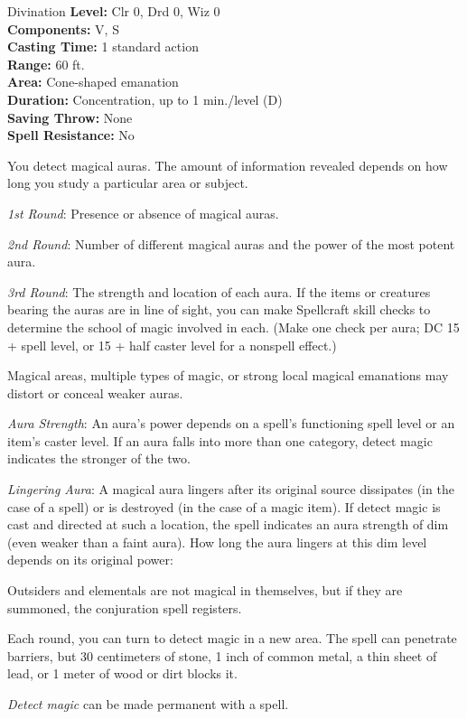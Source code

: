 {Divination}
{
	\textbf{Level:}
	Clr 0, Drd 0, Wiz 0\\
	\textbf{Components:}
	V, S\\
	\textbf{Casting Time:}
	1 standard action\\
	\textbf{Range:}
	60 ft.\\
	\textbf{Area:}
	Cone-shaped emanation\\
	\textbf{Duration:}
	Concentration, up to 1 min./level (D)\\
	\textbf{Saving Throw:}
	None\\
	\textbf{Spell Resistance:}
	No\\
}
{
	You detect magical auras. The amount of information revealed depends on how long you study a particular area or subject.

	\textit{1st Round}:
	Presence or absence of magical auras.

	\textit{2nd Round}:
	Number of different magical auras and the power of the most potent aura.

	\textit{3rd Round}:
	The strength and location of each aura. If the items or creatures bearing the auras are in line of sight, you can make Spellcraft skill checks to determine the school of magic involved in each. (Make one check per aura; DC 15 + spell level, or 15 + half caster level for a nonspell effect.)

	Magical areas, multiple types of magic, or strong local magical emanations may distort or conceal weaker auras.

	\textit{Aura Strength}:
	An aura's power depends on a spell's functioning spell level or an item's caster level. If an aura falls into more than one category, detect magic indicates the stronger of the two.

	\textit{Lingering Aura}:
	A magical aura lingers after its original source dissipates (in the case of a spell) or is destroyed (in the case of a magic item). If detect magic is cast and directed at such a location, the spell indicates an aura strength of dim (even weaker than a faint aura). How long the aura lingers at this dim level depends on its original power:


	Outsiders and elementals are not magical in themselves, but if they are summoned, the conjuration spell registers.

	Each round, you can turn to detect magic in a new area. The spell can penetrate barriers, but 30 centimeters of stone, 1 inch of common metal, a thin sheet of lead, or 1 meter of wood or dirt blocks it.

	\emph{Detect magic} can be made permanent with a  spell.

}
